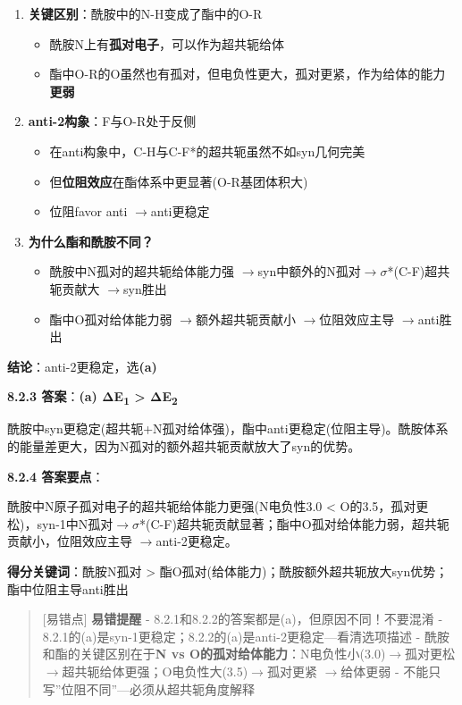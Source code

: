 \documentclass[a4paper,11pt]{ctexart}
\providecommand{\tightlist}{\setlength{\itemsep}{0pt}\setlength{\parskip}{0pt}}
\newcommand{\箭}{\ensuremath{\rightarrow}}
\newcommand{\左箭}{\ensuremath{\leftarrow}}
\newcommand{\上箭}{\ensuremath{\uparrow}}
\newcommand{\下箭}{\ensuremath{\downarrow}}
\newcommand{\衡}{\ensuremath{\rightleftharpoons}}
\newcommand{\双箭}{\ensuremath{\leftrightarrow}}
\newcommand{\约等于}{\ensuremath{\approx}}
\newcommand{\小于等于}{\ensuremath{\leq}}
\newcommand{\大于等于}{\ensuremath{\geq}}
\newcommand{\不等于}{\ensuremath{\neq}}
\newcommand{\西格马}{\ensuremath{\sigma}}
\newcommand{\派}{\ensuremath{\pi}}
\begin{document}
\begin{enumerate}
\def\labelenumi{\arabic{enumi}.}
\tightlist
\item
  \textbf{关键区别}：酰胺中的N-H变成了酯中的O-R

  \begin{itemize}
  \tightlist
  \item
    酰胺N上有\textbf{孤对电子}，可以作为超共轭给体
  \item
    酯中O-R的O虽然也有孤对，但电负性更大，孤对更紧，作为给体的能力\textbf{更弱}
  \end{itemize}
\item
  \textbf{anti-2构象}：F与O-R处于反侧

  \begin{itemize}
  \tightlist
  \item
    在anti构象中，C-H与C-F*的超共轭虽然不如syn几何完美
  \item
    但\textbf{位阻效应}在酯体系中更显著(O-R基团体积大)
  \item
    位阻favor anti \箭 anti更稳定
  \end{itemize}
\item
  \textbf{为什么酯和酰胺不同？}

  \begin{itemize}
  \tightlist
  \item
    酰胺中N孤对的超共轭给体能力强 \箭 syn中额外的N孤对\箭\西格马*(C-F)超共轭贡献大 \箭 syn胜出
  \item
    酯中O孤对给体能力弱 \箭 额外超共轭贡献小 \箭 位阻效应主导 \箭 anti胜出
  \end{itemize}
\end{enumerate}

\textbf{结论}：anti-2更稳定，选\textbf{(a)}

\textbf{8.2.3 答案}：\textbf{(a) ΔE\textsubscript{1} \textgreater{} ΔE\textsubscript{2}}

酰胺中syn更稳定(超共轭+N孤对给体强)，酯中anti更稳定(位阻主导)。酰胺体系的能量差更大，因为N孤对的额外超共轭贡献放大了syn的优势。

\textbf{8.2.4 答案要点}：

酰胺中N原子孤对电子的超共轭给体能力更强(N电负性3.0 \textless{} O的3.5，孤对更松)，syn-1中N孤对\箭\西格马*(C-F)超共轭贡献显著；酯中O孤对给体能力弱，超共轭贡献小，位阻效应主导 \箭 anti-2更稳定。

\textbf{得分关键词}：酰胺N孤对 \textgreater{} 酯O孤对(给体能力)；酰胺额外超共轭放大syn优势；酯中位阻主导anti胜出

\begin{quote}
{[}易错点{]} \textbf{易错提醒}
- 8.2.1和8.2.2的答案都是(a)，但原因不同！不要混淆
- 8.2.1的(a)是syn-1更稳定；8.2.2的(a)是anti-2更稳定---看清选项描述
- 酰胺和酯的关键区别在于\textbf{N vs O的孤对给体能力}：N电负性小(3.0)\箭 孤对更松 \箭 超共轭给体更强；O电负性大(3.5)\箭 孤对更紧 \箭 给体更弱
- 不能只写''位阻不同''---必须从超共轭角度解释
\end{quote}
\end{document}
